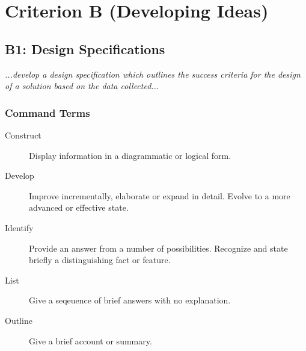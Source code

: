     \pagebreak
    \section*{Criterion B (Developing Ideas)}
    
    \subsection*{B1: Design Specifications}
    \emph{...develop a design specification which outlines the success criteria for the design of a solution based on the data collected...}

    \subsubsection*{Command Terms}
        \begin{description}
            \item[Construct] Display information in a diagrammatic or logical form.
            \item[Develop] Improve incrementally, elaborate or expand in detail. Evolve to a more advanced or effective state.
            \item[Identify]  Provide an answer from a number of possibilities. Recognize and state briefly a distinguishing fact or feature.
            \item[List] Give a seqeuence of brief answers with no explanation.
            \item[Outline] Give a brief account or summary.
        \end{description}
        
